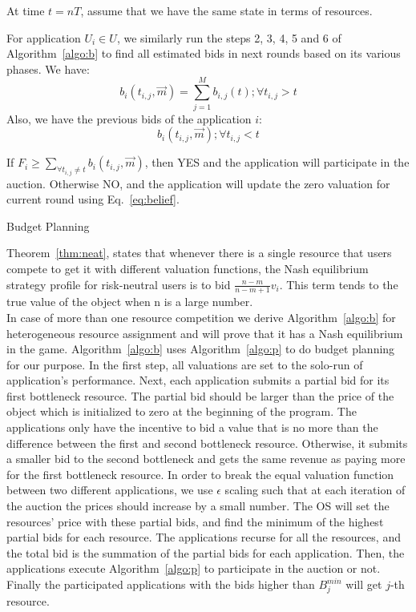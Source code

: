 \begin{algorithm}[!tb] %
\DontPrintSemicolon %
At time $t=nT$, assume that we have the same state in terms of resources.

For application $U_i \in U$, we similarly run the steps 2, 3, 4, 5 and 6 of Algorithm~\ref{algo:b} to find all estimated bids in next rounds based on its various phases. We have:
\[ b_{i}(t_{i,j},\vec{m})=\sum\limits_{j=1}^M {b_{i,j}(t)};\forall t_{i,j}>t \]
Also, we have the previous bids of the application $i$: 
\[ b_{i}(t_{i,j},\vec{m});\forall t_{i,j}<t \]

If $F_i \geq \sum\limits_{\forall t_{i,j}\neq t} {b_{i}(t_{i,j},\vec{m})}$, then YES and the application will participate in the auction. Otherwise NO, and the application will update the zero valuation for current round using Eq.~\ref{eq:belief}.

\caption{Budget Planning}
\label{algo:p}
\vspace{0\baselineskip}
\end{algorithm}
\indent Theorem~\ref{thm:neat}, states that whenever there is a single resource that users compete to get it with different valuation functions, the Nash equilibrium strategy profile for risk-neutral users is to bid $\frac{n-m}{n-m+1}v_i$. This term tends to the true value of the object when n is a large number. \\
\indent In case of more than one resource competition we derive Algorithm~\ref{algo:b} for heterogeneous resource assignment and will prove that it has a Nash equilibrium in the game. Algorithm~\ref{algo:b} uses Algorithm~\ref{algo:p} to do budget planning for our purpose. In the first step, all valuations are set to the solo-run of application's performance. Next, each application submits a partial bid for its first bottleneck resource. The partial bid should be larger than the price of the object which is initialized to zero at the beginning of the program. The applications only have the incentive to bid a value that is no more than the difference between the first and second bottleneck resource. Otherwise, it submits a smaller bid to the second bottleneck and gets the same revenue as paying more for the first bottleneck resource. In order to break the equal valuation function between two different applications, we use $\epsilon$ scaling such that at each iteration of the auction the prices should increase by a small number. The OS will set the resources' price with these partial bids, and find the minimum of the highest partial bids for each resource. The applications recurse for all the resources, and the total bid is the summation of the partial bids for each application. Then, the applications execute Algorithm~\ref{algo:p} to participate in the auction or not. Finally the participated applications with the bids higher than $B^{min}_j$ will get $j$-th resource.\\
